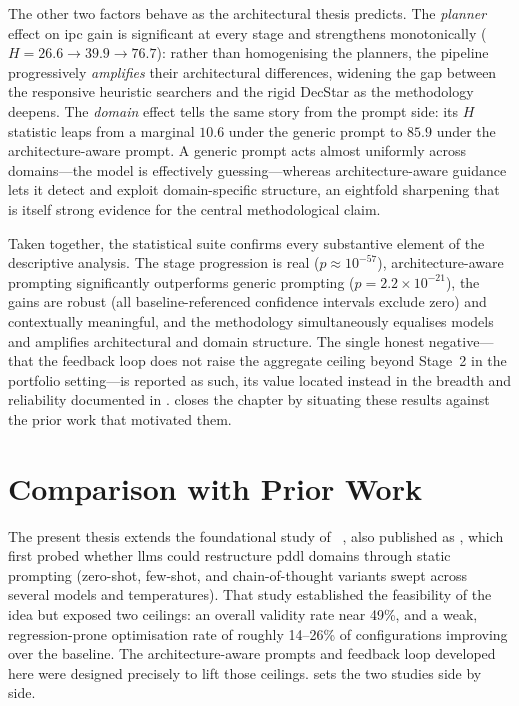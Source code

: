 The other two factors behave as the architectural thesis predicts. The \emph{planner} effect on \gls{ipc} gain is significant at every stage and strengthens monotonically ($H = 26.6 \rightarrow 39.9 \rightarrow 76.7$): rather than homogenising the planners, the pipeline progressively \emph{amplifies} their architectural differences, widening the gap between the responsive heuristic searchers and the rigid DecStar as the methodology deepens. The \emph{domain} effect tells the same story from the prompt side: its $H$ statistic leaps from a marginal $10.6$ under the generic prompt to $85.9$ under the architecture-aware prompt. A generic prompt acts almost uniformly across domains---the model is effectively guessing---whereas architecture-aware guidance lets it detect and exploit domain-specific structure, an eightfold sharpening that is itself strong evidence for the central methodological claim.

Taken together, the statistical suite confirms every substantive element of the descriptive analysis. The stage progression is real ($p \approx 10^{-57}$), architecture-aware prompting significantly outperforms generic prompting ($p = 2.2 \times 10^{-21}$), the gains are robust (all baseline-referenced confidence intervals exclude zero) and contextually meaningful, and the methodology simultaneously equalises models and amplifies architectural and domain structure. The single honest negative---that the feedback loop does not raise the aggregate ceiling beyond Stage~2 in the portfolio setting---is reported as such, its value located instead in the breadth and reliability documented in .  closes the chapter by situating these results against the prior work that motivated them.

\section{Comparison with Prior Work}
\label{sec:results:prior_work}

The present thesis extends the foundational study of \citeauthor{Elis2025}~\cite{Elis2025}, also published as \cite{Georgievski2025}, which first probed whether \glspl{llm} could restructure \gls{pddl} domains through static prompting (zero-shot, few-shot, and chain-of-thought variants swept across several models and temperatures). That study established the feasibility of the idea but exposed two ceilings: an overall validity rate near 49\%, and a weak, regression-prone optimisation rate of roughly 14--26\% of configurations improving over the baseline. The architecture-aware prompts and feedback loop developed here were designed precisely to lift those ceilings.  sets the two studies side by side.

